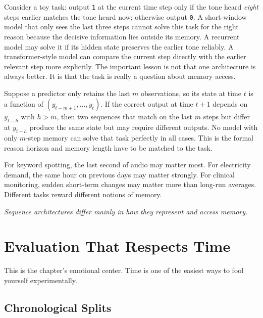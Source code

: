 \begin{example}
Consider a toy task: output \texttt{1} at the current time step only if the tone heard \emph{eight} steps earlier matches the tone heard now; otherwise output \texttt{0}. A short-window model that only sees the last three steps cannot solve this task for the right reason because the decisive information lies outside its memory. A recurrent model may solve it if its hidden state preserves the earlier tone reliably. A transformer-style model can compare the current step directly with the earlier relevant step more explicitly. The important lesson is not that one architecture is always better. It is that the task is really a question about memory access.
\end{example}

\begin{mathlens}
Suppose a predictor only retains the last $m$ observations, so its state at time $t$ is a function of $(y_{t-m+1},\ldots,y_t)$. If the correct output at time $t+1$ depends on $y_{t-h}$ with $h>m$, then two sequences that match on the last $m$ steps but differ at $y_{t-h}$ produce the same state but may require different outputs. No model with only $m$-step memory can solve that task perfectly in all cases. This is the formal reason horizon and memory length have to be matched to the task.
\end{mathlens}

\begin{example}
For keyword spotting, the last second of audio may matter most. For electricity demand, the same hour on previous days may matter strongly. For clinical monitoring, sudden short-term changes may matter more than long-run averages. Different tasks reward different notions of memory.
\end{example}

\begin{center}
\emph{Sequence architectures differ mainly in how they represent and access memory.}
\end{center}

\section{Evaluation That Respects Time}

This is the chapter's emotional center. Time is one of the easiest ways to fool yourself experimentally.

\subsection{Chronological Splits}

